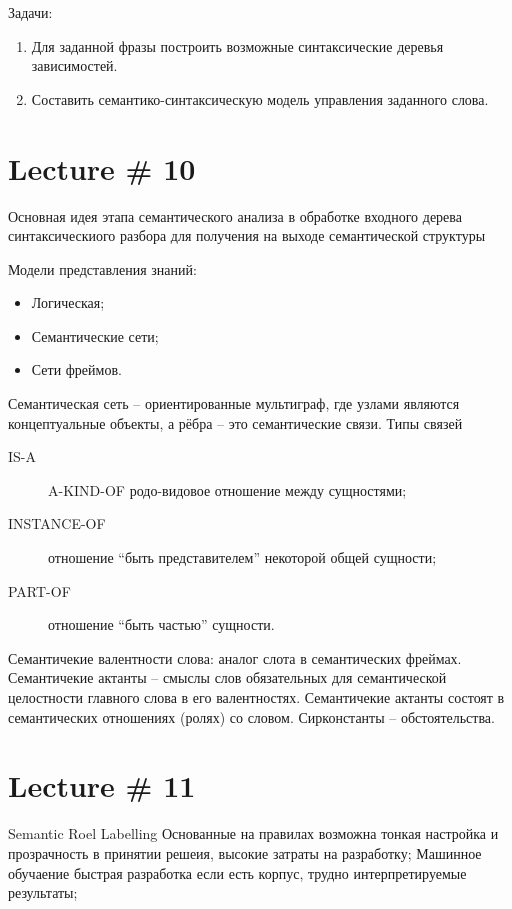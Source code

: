 \documentclass[a4paper]{article}
\newcommand{\eng}[1]{\foreignlanguage{english}{#1}}
\begin{document}
Задачи:
\begin{enumerate}
	\item Для заданной фразы построить возможные синтаксические деревья зависимостей.
	\item Составить семантико-синтаксическую модель управления заданного слова.
\end{enumerate}


\section{Lecture \# 10} %
\label{sec:lecture_10}
Основная идея этапа семантического анализа в обработке входного дерева синтаксическиого разбора для получения на выходе семантической структуры

Модели представления знаний: \begin{itemize}
	\item Логическая;
	\item Семантические сети;
	\item Сети фреймов.
\end{itemize}

Семантическая сеть -- ориентированные мультиграф, где узлами являются концептуальные
объекты, а рёбра -- это семантические связи. Типы связей \begin{description}
	\item[\eng{IS-A}] \eng{A-KIND-OF} родо-видовое отношение между сущностями;
	\item[\eng{INSTANCE-OF}] отношение ``быть представителем'' некоторой общей сущности;
	\item[\eng{PART-OF}] отношение ``быть частью'' сущности.
\end{description}

Семантичекие валентности слова: аналог слота в семантических фреймах. Семантичекие
актанты -- смыслы слов обязательных для семантической целостности главного слова в
его валентностях. Семантичекие актанты состоят в семантических отношениях (ролях)
со словом. Сирконстанты -- обстоятельства.


\section{Lecture \# 11} %
\label{sec:lecture_11}

\eng{Semantic Roel Labelling}
Основанные на правилах
возможна тонкая настройка и прозрачность в принятии решеия, высокие затраты на разработку;
Машинное обучаение
быстрая разработка если есть корпус, трудно интерпретируемые результаты;
\end{document}

